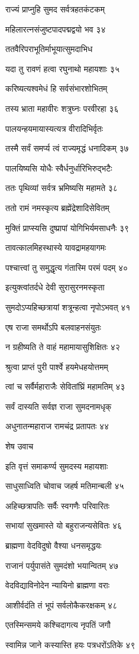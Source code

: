 राज्यं प्राप्नुहि सुमद सर्वत्रहतकंटकम्

महिलारत्नसंजुष्टपादपद्मद्वयो भव ३४

ततवैरिपराभूतिर्माभूयात्सुमदाभिध

यदा तु रावणं हत्वा रघुनाथो महायशाः ३५

करिष्यत्यश्वमेधं हि सर्वसंभारशोभितम्

तस्य भ्राता महावीरः शत्रुघ्नः परवीरहा ३६

पालयन्हयमायास्यत्यत्र वीरादिभिर्वृतः

तस्मै सर्वं समर्प्य त्वं राज्यमृद्धं धनादिकम् ३७

पालयिष्यसि योधैः स्वैर्धनुर्धारिभिरुद्भटैः

ततः पृथिव्यां सर्वत्र भ्रमिष्यसि महामते ३८

ततो रामं नमस्कृत्य ब्रह्मेंद्रेशादिसेवितम्

मुक्तिं प्राप्स्यसि दुष्प्रापां योगिभिर्यमसाधनैः ३९

तावत्कालमिहस्थास्ये यावद्रामहयागमः

पश्चात्त्वां तु समुद्धृत्य गंतास्मि परमं पदम् ४०

इत्युक्त्वांतर्दधे देवी सुरासुरनमस्कृता

सुमदोऽप्यहिच्छत्रायां शत्रून्हत्वा नृपोऽभवत् ४१

एष राजा समर्थोऽपि बलवाहनसंयुतः

न ग्रहीष्यति ते वाहं महामायासुशिक्षितः ४२

श्रुत्वा प्राप्तं पुरी पार्श्वे हयमेधहयोत्तमम्

त्वां च सर्वैर्महाराजैः सेवितांघ्रिं महामतिम् ४३

सर्वं दास्यति सर्वज्ञ राजा सुमदनामधृक्

अधुनातन्महाराज रामचंद्र प्रतापतः ४४

शेष उवाच

इति वृत्तं समाकर्ण्य सुमदस्य महायशाः

साधुसाध्विति चोवाच जहर्ष मतिमान्बली ४५

अहिच्छत्रापतिः सर्वैः स्वगणैः परिवारितः

सभायां सुखमास्ते यो बहुराजन्यसेवितः ४६

ब्राह्मणा वेदविदुषो वैश्या धनसमृद्धयः

राजानं पर्युपासंते सुमदंशो भयान्वितम् ४७

वेदविद्याविनोदेन न्यायिनो ब्राह्मणा वराः

आशीर्वदंति तं भूपं सर्वलोकैकरक्षकम् ४८

एतस्मिन्समये कश्चिदागत्य नृपतिं जगौ

स्वामिन्न जाने कस्यास्ति हयः पत्रधरोंऽतिके ४९

